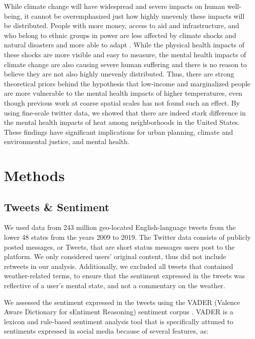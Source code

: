 \documentclass{article}
\begin{document}
While climate change will have widespread and severe impacts on human well-being, it cannot be overemphasized just how highly unevenly these impacts will be distributed.  People with more money, access to aid and infrastructure, and who belong to ethnic groups in power are less affected by climate shocks and natural disasters and more able to adapt \cite{bullard2012wrong}.  While the physical health impacts of these shocks are more visible and easy to measure, the mental health impacts of climate change are also causing severe human suffering and there is no reason to believe they are not also highly unevenly distributed.  Thus, there are strong theoretical priors behind the hypothesis that low-income and marginalized people are more vulnerable to the mental health impacts of higher temperatures, even though previous work at coarse spatial scales has not found such an effect.  By using fine-scale twitter data, we showed that there are indeed stark difference in the mental health impacts of heat among neighborhoods in the United States.  These findings have significant implications for urban planning, climate and environmental justice, and mental health.

\section{Methods}
\subsection{Tweets \& Sentiment}
We used data from 243 million geo-located English-language tweets from the lower 48 states from the years 2009 to 2019.  The Twitter data consists of publicly posted messages, or Tweets, that are short status messages users post to the platform.  We only considered users’ original content, thus did not include retweets in our analysis.  Additionally, we excluded all tweets that contained weather-related terms, to ensure that the sentiment expressed in the tweets was reflective of a user's mental state, and not a commentary on the weather.

We assessed the sentiment expressed in the tweets using the VADER (Valence Aware Dictionary for sEntiment Reasoning) sentiment corpus \cite{gilbert_vader_2014}. VADER is a lexicon and rule-based sentiment analysis tool that is specifically attuned to sentiments expressed in social media because of several features, as:
\end{document}
